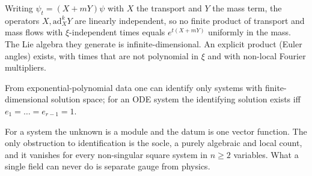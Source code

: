\begin{proposition}\label{prop:syse}
Writing $\psi_t=(X+mY)\psi$ with $X$ the transport and $Y$ the mass term, the operators $X,\mathrm{ad}_X^kY$ are linearly independent, so no finite product of transport and mass flows with $\xi$-independent times equals $e^{t(X+mY)}$ uniformly in the mass. The Lie algebra they generate is infinite-dimensional. An explicit product (Euler angles) exists, with times that are not polynomial in $\xi$ and with non-local Fourier multipliers.
\end{proposition}

\begin{proposition}\label{thm:sysr1}
From exponential-polynomial data one can identify only systems with finite-dimensional solution space; for an ODE system the identifying solution exists iff $e_1=\dots=e_{r-1}=1$.
\end{proposition}

\begin{takeaway}
For a system the unknown is a module and the datum is one vector function. The only obstruction to identification is the socle, a purely algebraic and local count, and it vanishes for every non-singular square system in $n\ge2$ variables. What a single field can never do is separate gauge from physics.
\end{takeaway}
